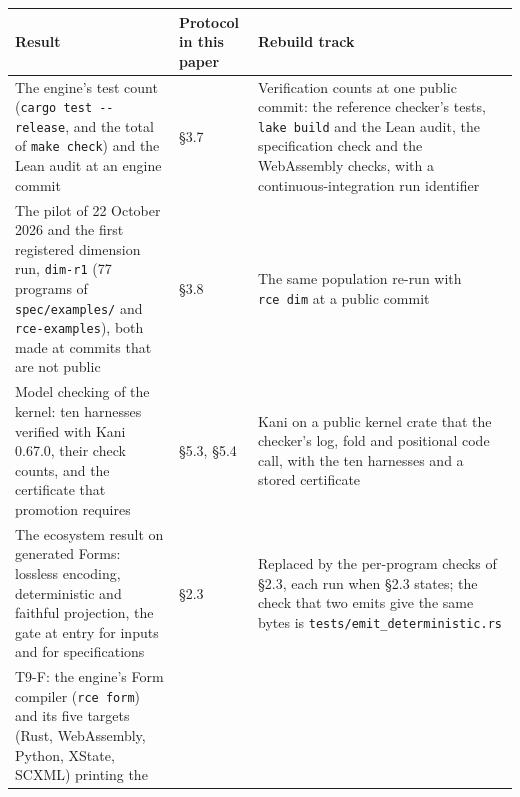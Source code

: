 \documentclass[10pt,letterpaper]{article}
\newcounter{none}
\begin{document}
{\def\LTcaptype{none} %
{\footnotesize\setlength{\tabcolsep}{3.8pt}\renewcommand{\arraystretch}{1.15}
\begin{longtable}[]{@{}
  >{\raggedright\arraybackslash}p{}
  >{\raggedright\arraybackslash}p{}
  >{\raggedright\arraybackslash}p{}@{}}
\toprule\noalign{}
\begin{minipage}[b]{\linewidth}\raggedright
\textbf{Result}
\end{minipage} & \begin{minipage}[b]{\linewidth}\raggedright
\textbf{Protocol in this paper}
\end{minipage} & \begin{minipage}[b]{\linewidth}\raggedright
\textbf{Rebuild track}
\end{minipage} \\
\midrule\noalign{}
\endhead
\bottomrule\noalign{}
\endlastfoot
The engine's test count (\texttt{cargo\ test\ -\allowbreak{}\/\allowbreak{}-\allowbreak{}release}, and the
total of \texttt{make\ check}) and the Lean audit at an engine commit &
§3.7 & Verification counts at one public commit: the reference checker's
tests, \texttt{lake\ build} and the Lean audit, the specification check
and the WebAssembly checks, with a continuous-integration run
identifier \\
The pilot of 22 October 2026 and the first registered dimension run,
\texttt{dim-r1} (77 programs of \texttt{spec/examples/} and
\texttt{rce-examples}), both made at commits that are not public & §3.8
& The same population re-run with \texttt{rce\ dim} at a public
commit \\
Model checking of the kernel: ten harnesses verified with Kani 0.67.0,
their check counts, and the certificate that promotion requires & §5.3,
§5.4 & Kani on a public kernel crate that the checker's log, fold and
positional code call, with the ten harnesses and a stored certificate \\
The ecosystem result on generated Forms: lossless encoding,
deterministic and faithful projection, the gate at entry for inputs and
for specifications & §2.3 & Replaced by the per-program checks of §2.3,
each run when §2.3 states; the check that two emits give the same bytes
is \texttt{tests/\allowbreak{}emit\_\allowbreak{}deterministic.\allowbreak{}rs} \\
T9-F: the engine's Form compiler (\texttt{rce\ form}) and its five
targets (Rust, WebAssembly, Python, XState, SCXML) printing the

\end{longtable}}}
\end{document}
